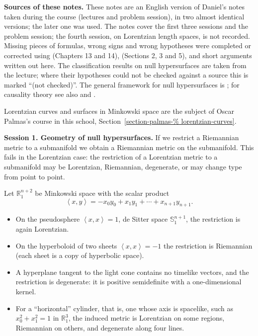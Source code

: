 \medskip\noindent
{\bf Sources of these notes.}
These notes are an English version of
Daniel's notes taken during the course
(lectures and problem session), in two
almost identical versions; the later one
was used. The notes cover the first three
sessions and the problem session; the
fourth session, on Lorentzian length
spaces, is not recorded. Missing pieces of
formulas, wrong signs and wrong hypotheses
were completed or corrected using
\cite{oneill} (Chapters 13 and 14),
\cite{navarro2020screen} (Sections 2, 3
and 5), and short arguments written out
here. The classification results on null
hypersurfaces are taken from the lecture;
where their hypotheses could not be
checked against a source this is marked
``(not checked)''. The general framework
for null hypersurfaces is
\cite{duggal1996lightlike}; for causality
theory see also \cite{minguzzi2019causality}
and \cite{hawking1973large}.

Lorentzian curves and surfaces in
Minkowski space are the subject of Oscar
Palmas's course in this school,
Section~\ref{section-palmas-%
lorentzian-curves}.

\medskip\noindent
{\bf Session 1. Geometry of null
hypersurfaces.}
If we restrict a Riemannian metric to a
submanifold we obtain a Riemannian metric
on the submanifold. This fails in the
Lorentzian case: the restriction of a
Lorentzian metric to a submanifold may be
Lorentzian, Riemannian, degenerate, or may
change type from point to point.

\begin{example}
\label{example-solis-induced-metrics}
Let $\mathbb{R}^{n+2}_1$ be Minkowski
space with the scalar product
$$
\left\langle{} x,y \right\rangle{}
=-x_0y_0+x_1y_1+\cdots+x_{n+1}y_{n+1}.
$$
\begin{itemize}
\item On the pseudosphere
$\left\langle{} x,x \right\rangle{}=1$,
de Sitter space $\mathbb{S}^{n+1}_1$,
the restriction is again Lorentzian.
\item On the hyperboloid of two sheets
$\left\langle{} x,x \right\rangle{}=-1$
the restriction is Riemannian (each sheet
is a copy of hyperbolic space).
\item A hyperplane tangent to the light
cone contains no timelike vectors, and the
restriction is degenerate: it is
positive semidefinite with a
one-dimensional kernel.
\item For a ``horizontal'' cylinder, that
is, one whose axis is spacelike, such as
$x_0^2+x_1^2=1$ in $\mathbb{R}^3_1$, the
induced metric is Lorentzian on some
regions, Riemannian on others, and
degenerate along four lines.
\end{itemize}
\end{example}

